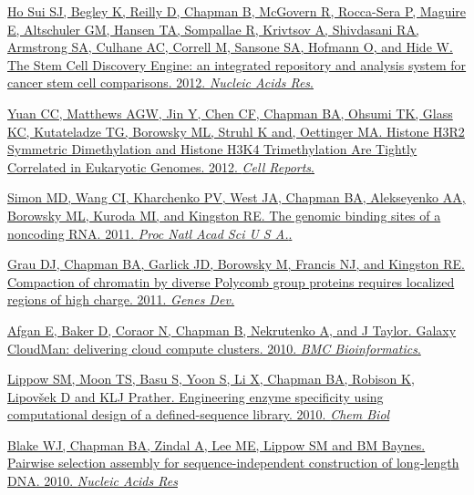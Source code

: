 \documentclass[10pt]{article}
\makeatletter
\newlength{\bibhang}
\newlength{\bibsep}
 {\@listi \global\bibsep\itemsep \global\advance\bibsep by\parsep}
\newenvironment{bibsection}%
        {\vspace{-\baselineskip}\begin{list}{}{%
       \setlength{\leftmargin}{\bibhang}%
       \setlength{\itemindent}{-\leftmargin}%
       \setlength{\itemsep}{\bibsep}%
       \setlength{\parsep}{\z@}%
        \setlength{\partopsep}{0pt}%
        \setlength{\topsep}{0pt}}}
        {\end{list}\vspace{-.6\baselineskip}}
\makeatother
\begin{document}
\begin{bibsection}
  \item \href{http://nar.oxfordjournals.org/content/40/D1/D984.long}
    {Ho Sui SJ, Begley K, Reilly D, Chapman B, McGovern R, Rocca-Sera
      P, Maguire E, Altschuler GM, Hansen TA, Sompallae R, Krivtsov A,
      Shivdasani RA, Armstrong SA, Culhane AC, Correll M, Sansone SA,
      Hofmann O, and Hide W. The Stem Cell Discovery Engine: an
    integrated repository and analysis system for cancer stem cell
    comparisons. 2012. \textit{Nucleic Acids Res}.}

  \item \href{http://www.cell.com/cell-reports/abstract/S2211-1247(11)00018-0}
    {Yuan CC, Matthews AGW, Jin Y, Chen CF, Chapman BA, Ohsumi TK,
      Glass KC, Kutateladze TG, Borowsky ML,
      Struhl K and, Oettinger MA. Histone H3R2 Symmetric Dimethylation
      and Histone H3K4 Trimethylation Are Tightly Correlated in
      Eukaryotic Genomes. 2012. \textit{Cell Reports}.}

  \item \href{http://www.pnas.org/content/108/51/20497.abstract}
    {Simon MD, Wang CI, Kharchenko PV, West JA, Chapman BA,
     Alekseyenko AA, Borowsky ML, Kuroda MI, and Kingston RE.
     The genomic binding sites of a noncoding RNA. 2011.
     \textit{Proc Natl Acad Sci U S A.}.}

  \item \href{http://genesdev.cshlp.org/content/25/20/2210.abstract}
    {Grau DJ, Chapman BA, Garlick JD, Borowsky M, Francis NJ, and Kingston
    RE. Compaction of chromatin by diverse Polycomb group proteins
    requires localized regions of high charge. 2011. \textit{Genes Dev.}}

  \item \href{http://www.biomedcentral.com/1471-2105/11/S12/S4}
    {Afgan E, Baker D, Coraor N, Chapman B, Nekrutenko A, and J Taylor.
    Galaxy CloudMan: delivering cloud compute clusters. 2010. \textit{BMC
    Bioinformatics}.}

  \item \href{http://www.cell.com/chemistry-biology/retrieve/pii/S1074552110004059}
    {Lippow SM, Moon TS, Basu S, Yoon S, Li X, Chapman BA, Robison K, Lipovšek D 
    and KLJ Prather.
    Engineering enzyme specificity using computational
     design of a defined-sequence library. 2010. \textit{Chem Biol}}

   \item \href{http://nar.oxfordjournals.org/content/38/8/2594.long}
     {Blake WJ, Chapman BA, Zindal A, Lee ME, Lippow SM and BM Baynes.
     Pairwise selection assembly for sequence-independent
     construction of long-length DNA. 2010. \textit{Nucleic Acids Res}}


\end{bibsection}
\end{document}
